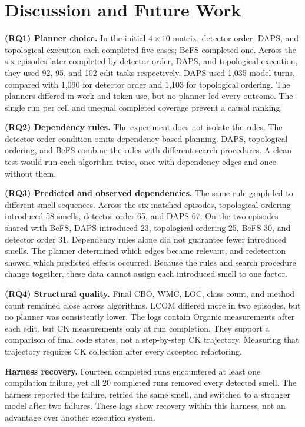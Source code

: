 \documentclass[conference]{IEEEtran}
\begin{document}
\section{Discussion and Future Work}

\textbf{(RQ1) Planner choice.} In the initial $4\times10$ matrix, detector
order, DAPS, and topological execution each completed five cases; BeFS completed
one. Across the six episodes later completed by detector order, DAPS, and
topological execution, they used 92, 95, and 102 edit tasks respectively. DAPS
used 1,035 model turns, compared with 1,090 for detector order and 1,103 for
topological ordering. The planners differed in work and token use, but no
planner led every outcome. The single run per cell and unequal completed
coverage prevent a causal ranking.

\textbf{(RQ2) Dependency rules.} The experiment does not isolate the rules.
The detector-order condition omits dependency-based planning. DAPS, topological
ordering, and BeFS combine the rules with different search procedures. A clean
test would run each algorithm twice, once with dependency edges and once
without them.

\textbf{(RQ3) Predicted and observed dependencies.} The same rule graph led to
different smell sequences. Across the six matched episodes,
topological ordering introduced 58 smells, detector order 65, and DAPS
67. On the two episodes shared with BeFS, DAPS introduced 23, topological
ordering 25, BeFS 30, and detector order 31. Dependency rules alone did
not guarantee fewer introduced smells. The planner determined which edges
became relevant, and redetection showed which predicted effects occurred.
Because the rules and search procedure change together, these data cannot
assign each introduced smell to one factor.

\textbf{(RQ4) Structural quality.} Final CBO, WMC, LOC, class count, and method
count remained close across algorithms. LCOM differed more in two episodes,
but no planner was consistently lower. The logs contain Organic measurements
after each edit, but CK measurements only at run completion. They support a
comparison of final code states, not a step-by-step CK trajectory. Measuring
that trajectory requires CK collection after every accepted refactoring.

\textbf{Harness recovery.} Fourteen completed runs encountered at least one
compilation failure, yet all 20 completed runs removed every detected smell.
The harness reported the failure, retried the same smell, and switched to a
stronger model after two failures. These logs show recovery within this
harness, not an advantage over another execution system.
\end{document}
